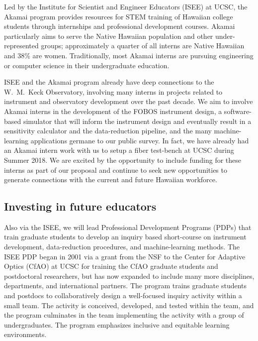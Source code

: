 \documentclass[oneside,11pt]{amsart}
\begin{document}
Led by the Institute for Scientist and Engineer Educators (ISEE) at
UCSC, the Akamai program provides resources for STEM training of
Hawaiian college students through internships and professional
development courses.  Akamai particularly aims to serve the Native
Hawaiian population and other under-represented groups; approximately a
quarter of all interns are Native Hawaiian and 38\% are women.
Traditionally, most Akamai interns are pursuing engineering or 
computer science in their undergraduate education.

ISEE and the Akamai program already have deep connections to the
W.~M.~Keck Observatory, involving many interns in projects related to
instrument and observatory development over the past decade.  We aim to
involve Akamai interns in the development of the FOBOS instrument
design, a software-based simulator that will inform the instrument
design and eventually result in a sensitivity calculator and the
data-reduction pipeline, and the many machine-learning applications
germane to our public survey.  In fact, we have already had an Akamai
intern work with us to setup a fiber test-bench at UCSC during Summer
2018.  We are excited by the opportunity to include funding for these
interns as part of our proposal and continue to seek new opportunities
to generate connections with the current and future Hawaiian workforce.

\subsection{Investing in future educators}

Also via the ISEE, we will lead Professional Development Programs (PDPs)
that train graduate students to develop an inquiry based short-course on
instrument development, data-reduction procedures, and machine-learning
methods.  The ISEE PDP began in 2001 via a grant from the NSF to the
Center for Adaptive Optics (CfAO) at UCSC for training the CfAO graduate
students and postdoctoral researchers, but has now expanded to include
many more disciplines, departments, and international partners.  The
program trains graduate students and postdocs to collaboratively design
a well-focused inquiry activity within a small team.  The activity is
conceived, developed, and tested within the team, and the program
culminates in the team implementing the activity with a group of
undergraduates.  The program emphasizes inclusive and equitable learning
environments.

\end{document}
